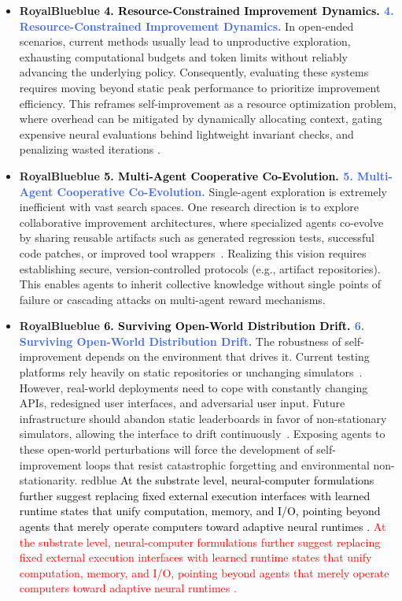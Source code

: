 \documentclass{article}
\let\oldtextcolor\textcolor
\renewcommand{\textcolor}[2]{
  \def\temp{#1}
  \def\red{blue}
  \ifx\temp\red
    \oldtextcolor{black}{#2}
  \else
    \oldtextcolor{#1}{#2}
  \fi
}
\begin{document}
\begin{itemize}[leftmargin=*, label={}, itemsep=0.9em, topsep=0.2em]
\item \textbf{\textcolor{RoyalBlue}{4. Resource-Constrained Improvement Dynamics.}} 
In open-ended scenarios, current methods usually lead to unproductive exploration, exhausting computational budgets and token limits without reliably advancing the underlying policy. Consequently, evaluating these systems requires moving beyond static peak performance to prioritize improvement efficiency. This reframes self-improvement as a resource optimization problem, where overhead can be mitigated by dynamically allocating context, gating expensive neural evaluations behind lightweight invariant checks, and  penalizing wasted iterations \citep{feng2026agentocrreimaginingagenthistory}.


\item \textbf{\textcolor{RoyalBlue}{5. Multi-Agent Cooperative Co-Evolution.}} Single-agent exploration is extremely inefficient with vast search spaces. One research direction is to explore collaborative improvement architectures, where specialized agents co-evolve by sharing reusable artifacts such as generated regression tests, successful code patches, or improved tool wrappers~\citep{chen2025multiagentevolvellmselfimprove, wang2026metagenselfevolvingrolestopologies}. Realizing this vision requires establishing secure, version-controlled protocols (e.g., artifact repositories). This enables agents to inherit collective knowledge without single points of failure or cascading attacks on multi-agent reward mechanisms.


\item \textbf{\textcolor{RoyalBlue}{6. Surviving Open-World Distribution Drift.}} The robustness of self-improvement depends on the environment that drives it. Current testing platforms  rely heavily on static repositories or unchanging simulators~\citep{sunil2026memorypoisoningattackdefense}. However, real-world deployments need to cope with constantly changing APIs, redesigned user interfaces, and adversarial user input. Future infrastructure should abandon static leaderboards in favor of non-stationary simulators, allowing the interface to drift continuously~\citep{anonymous2026gaia}. Exposing agents to these open-world perturbations will force the development of self-improvement loops that resist catastrophic forgetting and environmental non-stationarity. \textcolor{red}{At the substrate level, neural-computer formulations further suggest replacing fixed external execution interfaces with learned runtime states that unify computation, memory, and I/O, pointing beyond agents that merely operate computers toward adaptive neural runtimes \citep{zhuge2026neural, rivard2026neuralossimulatingoperatingsystems}.}
\end{itemize}
\end{document}
